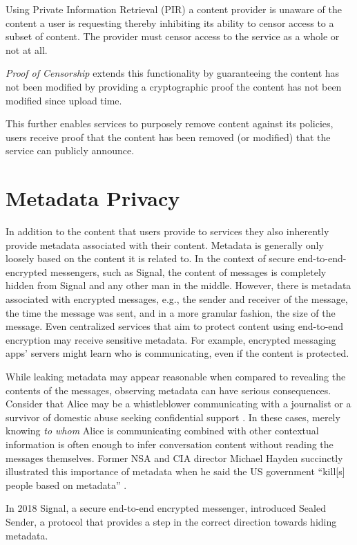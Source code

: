 Using Private Information Retrieval (PIR) a content provider is unaware of the
content a user is requesting thereby inhibiting its ability to censor access to
a subset of content. The provider must censor access to the service as a whole
or not at all.

\emph{Proof of Censorship} extends this functionality by guaranteeing the
content has not been modified by providing a cryptographic proof the content has
not been modified since upload time.

This further enables services to purposely remove content against its policies,
users receive proof that the content has been removed (or modified) that the
service can publicly announce.

\section{Metadata Privacy}
In addition to the content that users provide to services they also inherently
provide metadata associated with their content. Metadata is generally only
loosely based on the content it is related to. In the context of secure
end-to-end-encrypted messengers, such as Signal, the content of messages is
completely hidden from Signal and any other man in the middle. However, there is
metadata associated with encrypted messages, e.g., the sender and receiver of
the message, the time the message was sent, and in a more granular fashion, the
size of the message. Even centralized services that aim to protect content using
end-to-end encryption may receive sensitive metadata. For example, encrypted
messaging apps' servers might learn who is communicating, even if the content is
protected.

While leaking metadata may appear reasonable when compared to revealing the
contents of the messages, observing metadata can have serious consequences.
Consider that Alice may be a whistleblower communicating with a journalist
\cite{190976} or a survivor of domestic abuse seeking confidential support
\cite{236244}. In these cases, merely knowing \emph{to whom} Alice is
communicating combined with other contextual information is often enough to
infer conversation content without reading the messages themselves. Former NSA
and CIA director Michael Hayden succinctly illustrated this importance of
metadata when he said the US government ``kill[s] people based on metadata''
\cite{haydenmetadata}.

In 2018 Signal, a secure end-to-end encrypted messenger, introduced Sealed
Sender\cite{sealed-sender}, a protocol that provides a step in the correct
direction towards hiding metadata. 

